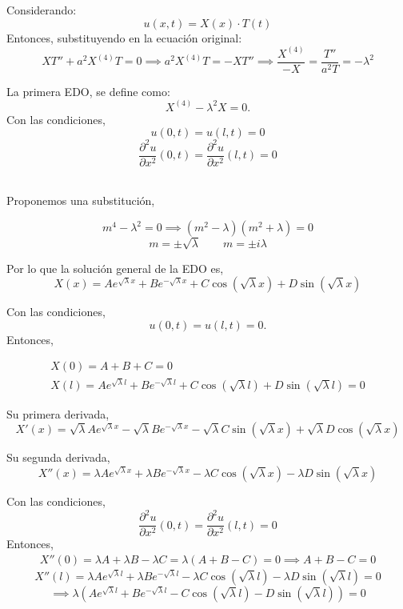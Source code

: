 \begin{solution}
Considerando: 
$$u(x,t)= X(x)\cdot T(t)$$
Entonces, substituyendo en la ecuación original:
$$XT''+a^2X^{(4)}T=0\implies a^2X^{(4)}T=-XT''\implies \frac{X^{(4)}}{-X}=\frac{T''}{a^2T}=-\lambda^2$$

\linea

La primera EDO, se define como: 
$$X^{(4)}-\lambda^2 X=0.$$
Con las condiciones,
$$u(0,t)=u(l,t)=0$$
$$\frac{\partial^{2} u}{\partial x^{2}}(0, t)=\frac{\partial^{2} u}{\partial x^{2}}(l, t)=0$$

\linita 

\\ 
Proponemos una substitución, 

$$m^4-\lambda^2=0\implies (m^2-\lambda)(m^2+\lambda)=0$$
$$m=\pm \sqrt{\lambda} \qquad m=\pm i\lambda$$

Por lo que la solución general de la EDO es,
$$X(x)=Ae^{\sqrt{\lambda}x}+Be^{-\sqrt{\lambda}x}+C\cos(\sqrt{\lambda}x)+D\sin(\sqrt{\lambda}x)$$

\lineata

Con las condiciones, 
$$u(0,t)=u(l,t)=0.$$
Entonces,

\setcounter{equation}{0}
\begin{gather}
    X(0)=A+B+C=0\\
    X(l)=Ae^{\sqrt{\lambda}l}+Be^{-\sqrt{\lambda}l}+C\cos(\sqrt{\lambda}l)+D\sin(\sqrt{\lambda}l)=0
\end{gather}


\lineata


Su primera derivada, 
$$X'(x)=\sqrt{\lambda}Ae^{\sqrt{\lambda}x}-\sqrt{\lambda}Be^{-\sqrt{\lambda}x}-\sqrt{\lambda}C\sin(\sqrt{\lambda}x)+\sqrt{\lambda}D\cos(\sqrt{\lambda}x)$$

Su segunda derivada, 
$$X''(x)=\lambda Ae^{\sqrt{\lambda}x}+\lambda Be^{-\sqrt{\lambda}x}-\lambda C\cos(\sqrt{\lambda}x)-\lambda D\sin(\sqrt{\lambda}x)$$

\lineata 

Con las condiciones, 
$$\frac{\partial^{2} u}{\partial x^{2}}(0, t)=\frac{\partial^{2} u}{\partial x^{2}}(l, t)=0$$
Entonces,
\begin{gather}
    X''(0)=\lambda A+\lambda B-\lambda C=\lambda(A+B-C)=0\implies A+B-C=0
\end{gather}
$$X''(l)= \lambda Ae^{\sqrt{\lambda}l}+\lambda Be^{-\sqrt{\lambda}l}-\lambda C\cos(\sqrt{\lambda}l)-\lambda D\sin(\sqrt{\lambda}l)=0$$
$$\implies \lambda (Ae^{\sqrt{\lambda}l} +Be^{-\sqrt{\lambda}l}- C\cos(\sqrt{\lambda}l)- D\sin(\sqrt{\lambda}l))=0$$


\end{solution}
